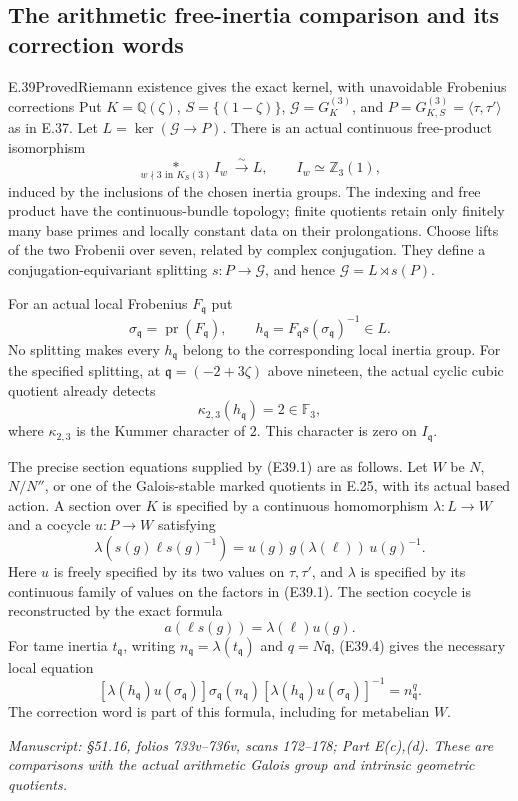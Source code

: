 \subsection{The arithmetic free-inertia comparison and its correction words}

\begin{statement}{E.39}{Proved}{Riemann existence gives the exact kernel, with unavoidable Frobenius corrections}
Put $K=\mathbb Q(\zeta)$, $S=\{(1-\zeta)\}$,
$\mathcal G=G_K^{(3)}$, and
$P=G_{K,S}^{(3)}=\langle\tau,\tau'\rangle$ as in E.37.
Let $L=\ker(\mathcal G\to P)$. There is an actual
continuous free-product isomorphism
\[
 \underset{w\nmid3\text{ in }K_S(3)}{\mathop{\ast}} I_w
       \ \xrightarrow{\ \sim\ } L,
 \qquad I_w\simeq\mathbb Z_3(1),
 \tag{E39.1}
\]
induced by the inclusions of the chosen inertia groups.
The indexing and free product have the continuous-bundle
topology; finite quotients retain only finitely many base
primes and locally constant data on their prolongations.
Choose lifts of the two Frobenii over seven, related by
complex conjugation. They define a conjugation-equivariant
splitting $s:P\to\mathcal G$, and hence
$\mathcal G=L\rtimes s(P)$.

For an actual local Frobenius $F_{\mathfrak q}$ put
\[
 \sigma_{\mathfrak q}=\operatorname{pr}(F_{\mathfrak q}),
 \qquad h_{\mathfrak q}
       =F_{\mathfrak q}s(\sigma_{\mathfrak q})^{-1}\in L.
 \tag{E39.2}
\]
No splitting makes every $h_{\mathfrak q}$ belong to
the corresponding local inertia group. For the specified
splitting, at $\mathfrak q=(-2+3\zeta)$ above nineteen,
the actual cyclic cubic quotient already detects
\[
 \kappa_{2,3}(h_{\mathfrak q})=2\in\mathbb F_3,
 \tag{E39.3}
\]
where $\kappa_{2,3}$ is the Kummer character of $2$.
This character is zero on $I_{\mathfrak q}$.

The precise section equations supplied by (E39.1) are
as follows. Let $W$ be $N$, $N/N''$, or one of the
Galois-stable marked quotients in E.25, with its actual
based action. A section over $K$ is specified by a
continuous homomorphism $\lambda:L\to W$ and a cocycle
$u:P\to W$ satisfying
\[
 \lambda(s(g)\ell s(g)^{-1})
       =u(g)\,g(\lambda(\ell))\,u(g)^{-1}.
 \tag{E39.4}
\]
Here $u$ is freely specified by its two values on
$\tau,\tau'$, and $\lambda$ is specified by its continuous
family of values on the factors in (E39.1). The section
cocycle is reconstructed by the exact formula
\[
 a(\ell s(g))=\lambda(\ell)u(g).
 \tag{E39.5}
\]
For tame inertia $t_{\mathfrak q}$, writing
$n_{\mathfrak q}=\lambda(t_{\mathfrak q})$ and
$q=N\mathfrak q$, (E39.4) gives the necessary local equation
\[
 [\lambda(h_{\mathfrak q})u(\sigma_{\mathfrak q})]
       \sigma_{\mathfrak q}(n_{\mathfrak q})
 [\lambda(h_{\mathfrak q})u(\sigma_{\mathfrak q})]^{-1}
       =n_{\mathfrak q}^{q}.
 \tag{E39.6}
\]
The correction word is part of this formula, including
for metabelian $W$.

\emph{Manuscript: \S51.16, folios 733v--736v, scans 172--178;
Part E(c),(d). These are comparisons with the actual arithmetic
Galois group and intrinsic geometric quotients.}
\end{statement}
